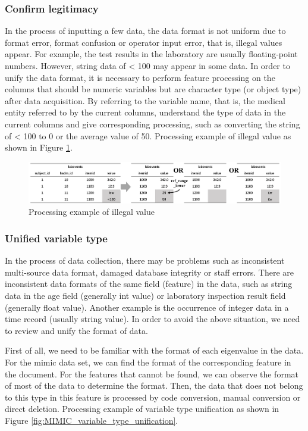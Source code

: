 \subsubsection{Confirm legitimacy}
In the process of inputting a few data, the data format is not uniform due to format error, format confusion or operator input error, that is, illegal values appear. For example, the test results in the laboratory are usually floating-point numbers. However, string data of < 100 may appear in some data. In order to unify the data format, it is necessary to perform feature processing on the columns that should be numeric variables but are character type (or object type) after data acquisition. By referring to the variable name, that is, the medical entity referred to by the current columns, understand the type of data in the current columns and give corresponding processing, such as converting the string of < 100 to 0 or the average value of 50. Processing example of illegal value as shown in Figure \ref{fig:MIMIC_illegal_value}.

\begin{figure}[ht]
    \centering
    \includegraphics[width=1\linewidth]{images/MIMIC_illegal_value.png}
    \caption{Processing example of illegal value}
    \label{fig:MIMIC_illegal_value}
\end{figure}


\subsubsection{Unified variable type}
In the process of data collection, there may be problems such as inconsistent multi-source data format, damaged database integrity or staff errors. There are inconsistent data formats of the same field (feature) in the data, such as string data in the age field (generally int value) or laboratory inspection result field (generally float value). Another example is the occurrence of integer data in a time record (usually string value). In order to avoid the above situation, we need to review and unify the format of data.

First of all, we need to be familiar with the format of each eigenvalue in the data. For the mimic data set, we can find the format of the corresponding feature in the document. For the features that cannot be found, we can observe the format of most of the data to determine the format. Then, the data that does not belong to this type in this feature is processed by code conversion, manual conversion or direct deletion. Processing example of variable type unification as shown in Figure \ref{fig:MIMIC_variable_type_unification}.

